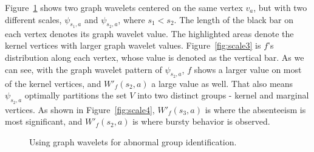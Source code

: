 Figure~\ref{fig:graphwaveletscale} shows two graph wavelets centered on the same vertex $v_a$, but with two different scales, $\psi_{s_1,a}$ and $\psi_{s_2, a}$, where $s_1<s_2$. The length of the black bar on each vertex denotes its graph wavelet value. The highlighted areas denote the kernel vertices with larger graph wavelet values.
Figure~\ref{fig:scale3} is $f$'s distribution along each vertex, whose value is denoted as the vertical bar. As we can see, with the graph wavelet pattern of $\psi_{s_2,a}$, $f$ shows a larger value on most of the kernel vertices, and $W'_f(s_2,a)$ a large value as well. That also means $\psi_{s_2,a}$ optimally partitions the set $V$ into two distinct groups - kernel and marginal vertices. As shown in Figure~\ref{fig:scale4}, $W'_f(s_3,a)$ is where the absenteeism is most significant, and $W'_f(s_2,a)$ is  where bursty behavior is observed.

\begin{figure}[t]
	\centering
\vspace{-2mm}
	\caption{Using graph wavelets for abnormal group identification.}
	\label{fig:graphwaveletscale}
\end{figure}


